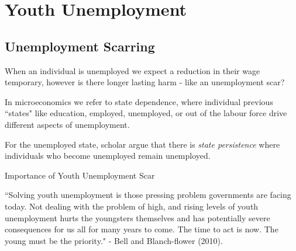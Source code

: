 \documentclass[../Main.tex]{subfiles}
\begin{document}
\chapter{Youth Unemployment}

\intro{


}

\section{Unemployment Scarring}

When an individual is unemployed we expect a reduction in their wage temporary, however is there longer lasting harm - like an unemployment scar? 

In microeconomics we refer to state dependence, where individual previous
``states" like education, employed, unemployed, or out of the labour force drive
different aspects of unemployment. 

For the unemployed state, scholar argue that there is \textit{state persistence}
where individuals who become unemployed remain unemployed.

{Importance of Youth Unemployment Scar} 

``Solving youth unemployment is those pressing problem governments are facing
today. Not dealing with the problem of high, and rising levels of youth
unemployment hurts the youngsters themselves and has potentially severe
consequences for us all for many years to come. The time to act is now. The
young must be the priority." - Bell and Blanch-flower (2010). 
\end{document}

